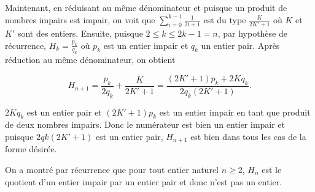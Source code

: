 {{\begin{itemize}
Maintenant, en réduisant au même dénominateur et puisque un produit de nombres impairs est impair, on voit 
que $\sum_{i=0}^{k-1}\frac{1}{2i+1}$ est du type $\frac{K}{2K'+1}$ où $K$ et $K'$ sont des entiers. Ensuite, puisque
$2\leq k\leq2k-1=n$, par hypothèse de récurrence, $H_k=\frac{p_k}{q_k}$ où $p_k$ est un entier impair et $q_k$ un
entier pair. Après réduction au même dénominateur, on obtient

$$H_{n+1}=\frac{p_k}{2q_k}+\frac{K}{2K'+1}=\frac{(2K'+1)p_k+2Kq_k}{2q_k(2K'+1)}.$$

$2Kq_k$ est un entier pair et $(2K'+1)p_k$ est un entier impair en tant que produit de deux nombres impairs. Donc le
numérateur est bien un entier impair et puisque $2qk(2K'+1)$ est un entier pair, $H_{n+1}$ est bien dans tous les cas de
la forme désirée.
\end{itemize}
On a montré par récurrence que pour tout entier naturel $n\geq2$, $H_n$ est le quotient d'un entier impair par un entier pair
et donc n'est pas un entier.
}
}
